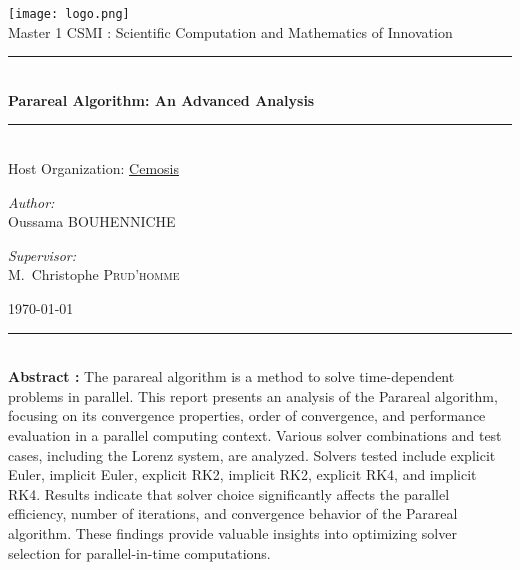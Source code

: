 \documentclass[a4paper,12pt,french]{article}
\begin{document}

\begin{titlepage}
\begin{center}

\texttt{[image: logo.png]}\\[1cm]

{\large Master 1 CSMI : Scientific Computation and Mathematics of Innovation}\\[0.5cm]

\rule{\linewidth}{0.5mm} \\[0.4cm]
{ \huge \bfseries Parareal Algorithm: An Advanced Analysis\\[0.4cm] }
\rule{\linewidth}{0.5mm} \\[1.5cm]
{\large Host Organization: \hyperlink{https://www.cemosis.fr/}{Cemosis}}\\[0.5cm]

\noindent
\begin{minipage}{0.6\textwidth}
  \begin{flushleft} \large
    \emph{Author:}\\
    Oussama \textsc{BOUHENNICHE}
  \end{flushleft}
\end{minipage}%
\begin{minipage}{0.4\textwidth}
  \begin{flushright} \large
    \emph{Supervisor:} \\
    M.~Christophe \textsc{Prud'homme}
  \end{flushright}
\end{minipage}



\vfill

{\today}

\end{center}
\end{titlepage}

\newpage
\thispagestyle{empty}

\vspace*{\fill}
\noindent\rule[2pt]{\textwidth}{0.5pt}\\
{\textbf{Abstract :}}
The parareal algorithm is a method to solve time-dependent problems in parallel. This report presents an analysis of the Parareal algorithm, focusing on its convergence properties, order of convergence, and performance evaluation in a parallel computing context. Various solver combinations and test cases, including the Lorenz system, are analyzed. Solvers tested include explicit Euler, implicit Euler, explicit RK2, implicit RK2, explicit RK4, and implicit RK4. Results indicate that solver choice significantly affects the parallel efficiency, number of iterations, and convergence behavior of the Parareal algorithm. These findings provide valuable insights into optimizing solver selection for parallel-in-time computations.
\end{document}
